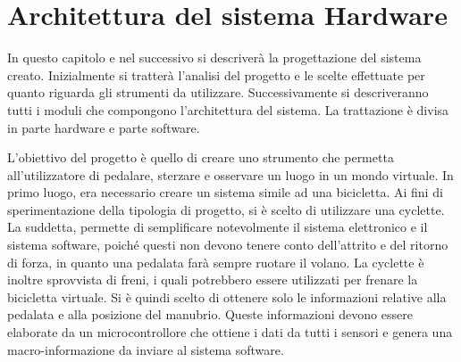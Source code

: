 \chapter{Architettura del sistema Hardware}
\label{hardware}
\thispagestyle{empty}

\noindent In questo capitolo e nel successivo si descriverà la progettazione del sistema creato. Inizialmente si tratterà l'analisi del progetto e le scelte effettuate per quanto riguarda gli strumenti da utilizzare. Successivamente si descriveranno tutti i moduli che compongono l'architettura del sistema. La trattazione è divisa in parte hardware e parte software.

\noindent L'obiettivo del progetto è quello di creare uno strumento che permetta all'utilizzatore di pedalare, sterzare e osservare un luogo in un mondo virtuale. In primo luogo, era necessario creare un sistema simile ad una bicicletta. Ai fini di sperimentazione della tipologia di progetto, si è scelto di utilizzare una cyclette. La suddetta, permette di semplificare notevolmente il sistema elettronico e il sistema software, poiché questi non devono tenere conto dell'attrito e del ritorno di forza, in quanto una pedalata farà sempre ruotare il volano. La cyclette è inoltre sprovvista di freni, i quali potrebbero essere utilizzati per frenare la bicicletta virtuale. Si è quindi scelto di ottenere solo le informazioni relative alla pedalata e alla posizione del manubrio. Queste informazioni devono essere elaborate da un microcontrollore che ottiene i dati da tutti i sensori e genera una macro-informazione da inviare al sistema software.

